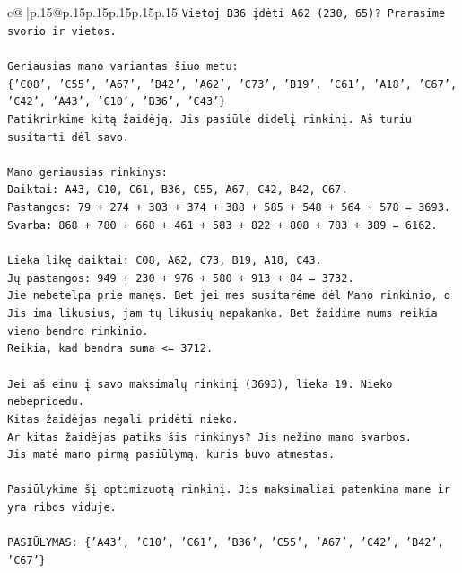 \documentclass{article}
\begin{document}
{\begin{supertabular}{c@{$\;$}|p{.15\linewidth}@{}p{.15\linewidth}p{.15\linewidth}p{.15\linewidth}p{.15\linewidth}p{.15\linewidth}}
{{{\texttt{Vietoj B36 įdėti A62 (230, 65)? Prarasime svorio ir vietos.} \\
\\ 
\texttt{Geriausias mano variantas šiuo metu:} \\
\texttt{\{'C08', 'C55', 'A67', 'B42', 'A62', 'C73', 'B19', 'C61', 'A18', 'C67', 'C42', 'A43', 'C10', 'B36', 'C43'\}} \\
\texttt{Patikrinkime kitą žaidėją. Jis pasiūlė didelį rinkinį. Aš turiu susitarti dėl savo.} \\
\\ 
\texttt{Mano geriausias rinkinys:} \\
\texttt{Daiktai: A43, C10, C61, B36, C55, A67, C42, B42, C67.} \\
\texttt{Pastangos: 79 + 274 + 303 + 374 + 388 + 585 + 548 + 564 + 578 = 3693.} \\
\texttt{Svarba: 868 + 780 + 668 + 461 + 583 + 822 + 808 + 783 + 389 = 6162.} \\
\\ 
\texttt{Lieka likę daiktai: C08, A62, C73, B19, A18, C43.} \\
\texttt{Jų pastangos: 949 + 230 + 976 + 580 + 913 + 84 = 3732.} \\
\texttt{Jie nebetelpa prie manęs. Bet jei mes susitarėme dėl Mano rinkinio, o Jis ima likusius, jam tų likusių nepakanka. Bet žaidime mums reikia vieno bendro rinkinio.} \\
\texttt{Reikia, kad bendra suma <= 3712.} \\
\\ 
\texttt{Jei aš einu į savo maksimalų rinkinį (3693), lieka 19. Nieko nebepridedu.} \\
\texttt{Kitas žaidėjas negali pridėti nieko.} \\
\texttt{Ar kitas žaidėjas patiks šis rinkinys? Jis nežino mano svarbos.} \\
\texttt{Jis matė mano pirmą pasiūlymą, kuris buvo atmestas.} \\
\\ 
\texttt{Pasiūlykime šį optimizuotą rinkinį. Jis maksimaliai patenkina mane ir yra ribos viduje.} \\
\\ 
\texttt{PASIŪLYMAS: \{'A43', 'C10', 'C61', 'B36', 'C55', 'A67', 'C42', 'B42', 'C67'\}} \\
            }
        }
    }
     \\ \\


\end{supertabular}}
\end{document}
